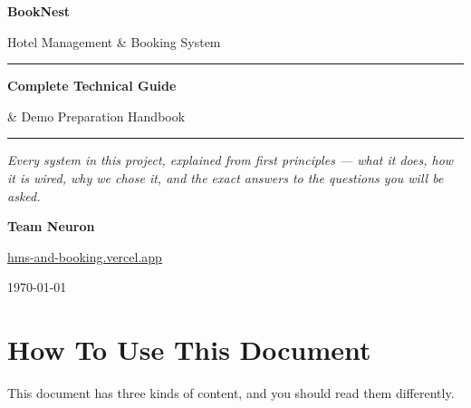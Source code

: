 \documentclass[11pt,a4paper]{article}
\begin{document}
\begin{titlepage}
\centering
\vspace*{2.2cm}
{\Huge\bfseries\color{primary} BookNest\par}
\vspace{0.4cm}
{\large Hotel Management \& Booking System\par}
\vspace{1.4cm}
\rule{0.75\textwidth}{1.2pt}\par
\vspace{0.7cm}
{\LARGE\bfseries Complete Technical Guide\par}
\vspace{0.35cm}
{\large \& Demo Preparation Handbook\par}
\vspace{0.7cm}
\rule{0.75\textwidth}{1.2pt}\par
\vspace{1.4cm}

\begin{minipage}{0.82\textwidth}
\centering\itshape
Every system in this project, explained from first principles ---
what it does, how it is wired, why we chose it, and the exact
answers to the questions you will be asked.
\end{minipage}

\vspace{2.4cm}
{\large\bfseries Team Neuron\par}
\vspace{0.3cm}
{\small \href{https://hms-and-booking.vercel.app}{hms-and-booking.vercel.app}\par}
\vspace{1.6cm}
{\small \today\par}
\end{titlepage}

\tableofcontents
\newpage

\section{How To Use This Document}

This document has three kinds of content, and you should read them differently.
\end{document}
